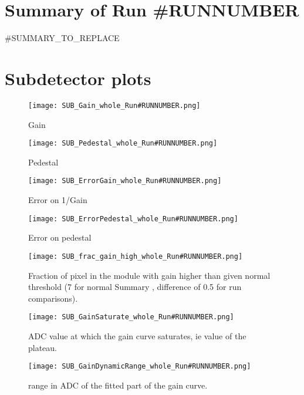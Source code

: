 \documentclass[a4paper,10pt]{article}
\begin{document}
\tableofcontents
\clearpage

\section{Summary of Run #RUNNUMBER}

#SUMMARY_TO_REPLACE

\clearpage

\section{Subdetector plots\label{sec:subdetector}}

\begin{figure}[htp]
 \centering
\texttt{[image: SUB\_Gain\_whole\_Run\#RUNNUMBER.png]}
\caption{Gain}
\end{figure}


\begin{figure}[htp]
 \centering
\texttt{[image: SUB\_Pedestal\_whole\_Run\#RUNNUMBER.png]}
\caption{Pedestal}
\end{figure}


\begin{figure}[htp]
 \centering
\texttt{[image: SUB\_ErrorGain\_whole\_Run\#RUNNUMBER.png]}
\caption{Error on 1/Gain}
\end{figure}


\begin{figure}[htp]
 \centering
\texttt{[image: SUB\_ErrorPedestal\_whole\_Run\#RUNNUMBER.png]}
\caption{Error on pedestal}
\end{figure}

\begin{figure}[htp]
 \centering
  \texttt{[image: SUB\_frac\_gain\_high\_whole\_Run\#RUNNUMBER.png]}
\caption{Fraction of pixel in the module with gain higher than given normal threshold (7 for normal Summary , difference of 0.5
for run comparisons).}
\end{figure}

\begin{figure}[htp]
 \centering
  \texttt{[image: SUB\_GainSaturate\_whole\_Run\#RUNNUMBER.png]}
\caption{ADC value at which the gain curve saturates, ie value of the plateau.}
\end{figure}

\begin{figure}[htp]
 \centering
  \texttt{[image: SUB\_GainDynamicRange\_whole\_Run\#RUNNUMBER.png]}
\caption{range in ADC of the fitted part of the gain curve.}
\end{figure}
\end{document}
